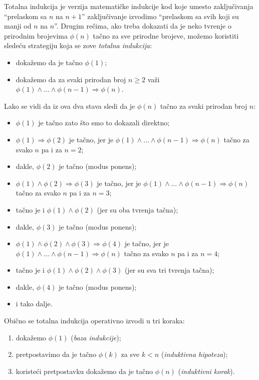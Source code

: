 Totalna indukcija je verzija matemati\v cke indukcije kod koje umesto zaklju\v civanja ``prelaskom sa $n$ na $n + 1$''
zaklju\v civanje izvodimo ``prelaskom sa svih koji su manji od $n$ na $n$''. Drugim re\v cima,
ako treba dokazati da je neko tvr\dj enje o prirodnim brojevima $\phi(n)$ ta\v cno za sve prirodne brojeve, mo\v zemo
koristiti slede\'cu strategiju koja se zove \emph{totalna indukcija}:
\begin{itemize}
\item doka\v zemo da je ta\v cno $\phi(1)$;
\item doka\v zemo da za svaki prirodan broj $n \ge 2$ va\v zi $\phi(1) \land \ldots \land \phi(n - 1) \Rightarrow \phi(n)$.
\end{itemize}
Lako se vidi da iz ova dva stava sledi da je $\phi(n)$ ta\v cno za svaki prirodan broj $n$:
\begin{itemize}
\item $\phi(1)$ je ta\v cno zato \v sto smo to dokazali direktno;
\item $\phi(1) \Rightarrow \phi(2)$ je ta\v cno, jer je $\phi(1) \land \ldots \land \phi(n - 1) \Rightarrow \phi(n)$ ta\v cno za svako $n$ pa i za $n = 2$;
\item dakle, $\phi(2)$ je ta\v cno (modus ponens);
\item $\phi(1) \land \phi(2) \Rightarrow \phi(3)$ je ta\v cno, jer je $\phi(1) \land \ldots \land \phi(n - 1) \Rightarrow \phi(n)$ ta\v cno za svako $n$ pa i za $n = 3$;
\item ta\v cno je i $\phi(1) \land \phi(2)$ (jer su oba tvr\dj enja ta\v cna);
\item dakle, $\phi(3)$ je ta\v cno (modus ponens);
\item $\phi(1) \land \phi(2) \land \phi(3) \Rightarrow \phi(4)$ je ta\v cno, jer je $\phi(1) \land \ldots \land \phi(n - 1) \Rightarrow \phi(n)$ ta\v cno za svako $n$ pa i za $n = 4$;
\item ta\v cno je i $\phi(1) \land \phi(2) \land \phi(3)$ (jer su sva tri tvr\dj enja ta\v cna);
\item dakle, $\phi(4)$ je ta\v cno (modus ponens);
\item i tako dalje.
\end{itemize}
Obi\v cno se totalna indukcija operativno izvodi u tri koraka:
\begin{enumerate}
\item doka\v zemo $\phi(1)$ (\emph{baza indukcije});
\item pretpostavimo da je ta\v cno $\phi(k)$ za sve $k < n$ (\emph{induktivna hipoteza});
\item koriste\'ci pretpostavku doka\v zemo da je ta\v cno $\phi(n)$ (\emph{induktivni korak}).
\end{enumerate}


